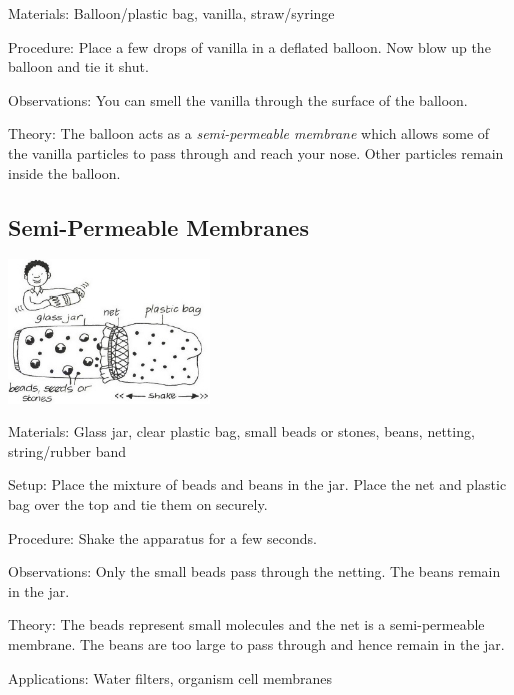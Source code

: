 \begin{multicols}{2}
\begin{description*}
\item[Materials:]{Balloon/plastic bag, vanilla, straw/syringe}
\item[Procedure:]{Place a few drops of vanilla in a deflated balloon. Now blow up the balloon and tie it shut.}
\item[Observations:]{You can smell the vanilla through the surface of the balloon.}
\item[Theory:]{The balloon acts as a \emph{semi-permeable membrane} which allows some of the vanilla particles to pass through and reach your nose. Other particles remain inside the balloon.}
\end{description*}

\subsection{Semi-Permeable Membranes}

\begin{center}
\includegraphics[width=0.4\textwidth]{./img/vso/membrane.jpg}
\end{center}

\begin{description*}
\item[Materials:]{Glass jar, clear plastic bag, small beads or stones, beans, netting, string/rubber band}
\item[Setup:]{Place the mixture of beads and beans in the jar. Place the net and plastic bag over the top and tie them on securely.}
\item[Procedure:]{Shake the apparatus for a few seconds.}
\item[Observations:]{Only the small beads pass through the netting. The beans remain in the jar.}
\item[Theory:]{The beads represent small molecules and the net is a semi-permeable membrane. The beans are too large to pass through and hence remain in the jar.}
\item[Applications:]{Water filters, organism cell membranes}
\end{description*}


\end{multicols}
